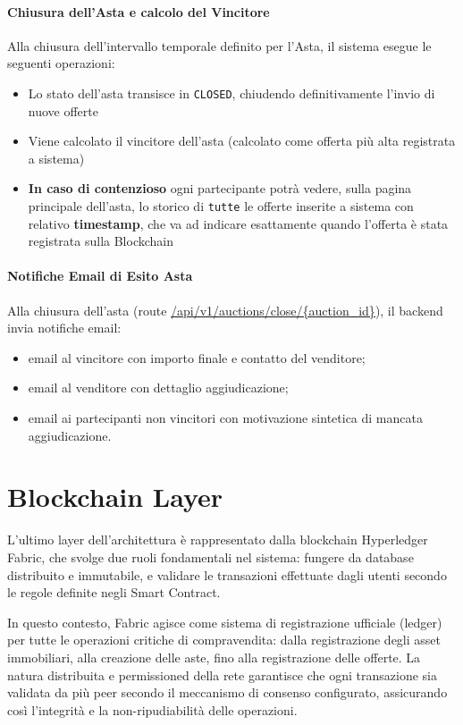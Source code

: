 \paragraph{Chiusura dell'Asta e calcolo del Vincitore}
Alla chiusura dell'intervallo temporale definito per l'Asta, il sistema esegue le seguenti operazioni:
\begin{itemize}
    \item Lo stato dell'asta transisce in \texttt{CLOSED}, chiudendo definitivamente l'invio di nuove offerte
    \item Viene calcolato il vincitore dell'asta (calcolato come offerta più alta registrata a sistema)
    \item \textbf{In caso di contenzioso} ogni partecipante potrà vedere, sulla pagina principale dell'asta, lo storico di \texttt{tutte} le offerte inserite a sistema con relativo \textbf{timestamp}, che va ad indicare esattamente quando l'offerta è stata registrata sulla Blockchain
\end{itemize}

\paragraph{Notifiche Email di Esito Asta}
Alla chiusura dell'asta (route \url{/api/v1/auctions/close/\{auction\_id\}}), il backend invia notifiche email:
\begin{itemize}
    \item email al vincitore con importo finale e contatto del venditore;
    \item email al venditore con dettaglio aggiudicazione;
    \item email ai partecipanti non vincitori con motivazione sintetica di mancata aggiudicazione.
\end{itemize}

\newpage
\section{Blockchain Layer}
L'ultimo layer dell'architettura è rappresentato dalla blockchain Hyperledger Fabric, che svolge due ruoli fondamentali nel sistema: fungere da database distribuito e immutabile, e validare le transazioni effettuate dagli utenti secondo le regole definite negli Smart Contract.

In questo contesto, Fabric agisce come sistema di registrazione ufficiale (ledger) per tutte le operazioni critiche di compravendita: dalla registrazione degli asset immobiliari, alla creazione delle aste, fino alla registrazione delle offerte. La natura distribuita e permissioned della rete garantisce che ogni transazione sia validata da più peer secondo il meccanismo di consenso configurato, assicurando così l'integrità e la non-ripudiabilità delle operazioni.

